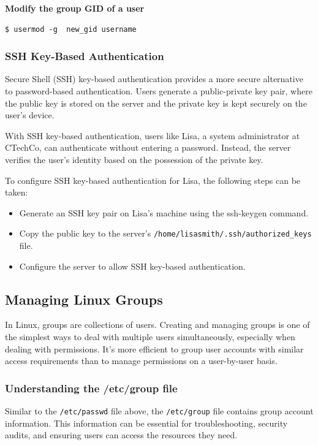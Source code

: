 \documentclass{article}
\newenvironment{codetemplate}[1][]{%
  \mybasecolorbox[#1]
  \itshape
}{%
  \endmybasecolorbox
}
\begin{document}
\textbf{Modify the group GID of a user}
\begin{codetemplate}{}
\begin{verbatim}
$ usermod -g  new_gid username
\end{verbatim}
\end{codetemplate}

\subsubsection{SSH Key-Based Authentication}
Secure Shell (SSH) key-based authentication provides a more secure alternative to password-based authentication. Users generate a public-private key pair, where the public key is stored on the server and the private key is kept securely on the user's device.

With SSH key-based authentication, users like Lisa, a system administrator at CTechCo, can authenticate without entering a password. Instead, the server verifies the user's identity based on the possession of the private key.

To configure SSH key-based authentication for Lisa, the following steps can be taken:

\begin{itemize}
    \item Generate an SSH key pair on Lisa's machine using the ssh-keygen command.
    \item Copy the public key to the server's \verb|/home/lisasmith/.ssh/authorized_keys| file.
    \item Configure the server to allow SSH key-based authentication.
\end{itemize}


\subsection{Managing Linux Groups}
In Linux, groups are collections of users. Creating and managing groups is one of the simplest ways to deal with multiple users simultaneously, especially when dealing with permissions. It's more efficient to group user accounts with similar access requirements than to manage permissions on a user-by-user basis.


\subsubsection{Understanding the /etc/group file}
Similar to the \verb|/etc/passwd| file above, the \verb|/etc/group| file contains group account information. This information can be essential for troubleshooting, security audits, and ensuring users can access the resources they need.
\end{document}
